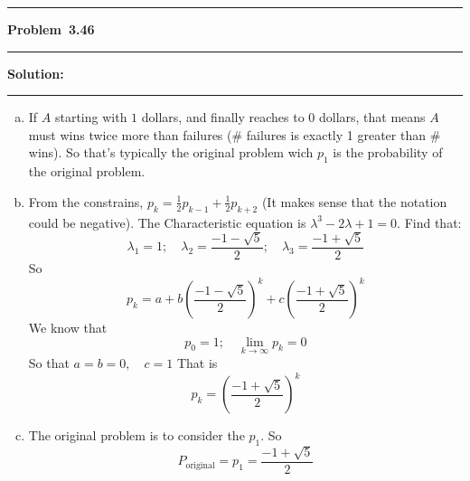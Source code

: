 \documentclass[10.5pt]{article}
\newcommand\question[1]{\vspace{.2in}\hrule\vspace{0.04in}\textbf{Problem\ #1}\vspace{.4em}\hrule\vspace{.10in}}
\newcommand\Solution{\vspace{.3in}\textbf{Solution:}\vspace{.5em}\hrule\vspace{.08in}\par}
\begin{document}
\pagebreak

\question{3.46}
\Solution{}
\begin{enumerate}[(a)] 
	\item If $A$ starting with $1$ dollars, and finally reaches to 0 dollars, that means $A$ must wins twice more than failures (\# failures is exactly 1 greater than \# wins). So that's typically the original problem wich $p_1$ is the probability of the original problem.
	\vspace{1cm}
	\item From the constrains, $p_k = \frac{1}{2}p_{k-1}+\frac{1}{2}p_{k+2}$ (It makes sense that the notation could be negative). The Characteristic equation is $\lambda^3-2\lambda+1 = 0$. Find that:
	$$\lambda_1 = 1;\quad\lambda_2 = \frac{-1-\sqrt{5}}{2};\quad\lambda_3 = \frac{-1+\sqrt{5}}{2}$$
	So $$p_k = a+b\left(\frac{-1-\sqrt{5}}{2}\right)^k+c\left(\frac{-1+\sqrt{5}}{2}\right)^k$$
	We know that $$p_0 = 1;\quad \lim_{k \to \infty} p_k = 0$$
	So that $a = b = 0,\quad c = 1$
	That is $$p_k = \left(\frac{-1+\sqrt{5}}{2}\right)^k$$
	\vspace{1cm}
	\item The original problem is to consider the $p_1$.
	So $$P_{\text{original}} = p_1 = \frac{-1+\sqrt{5}}{2}$$
\end{enumerate}

\pagebreak
\end{document}
